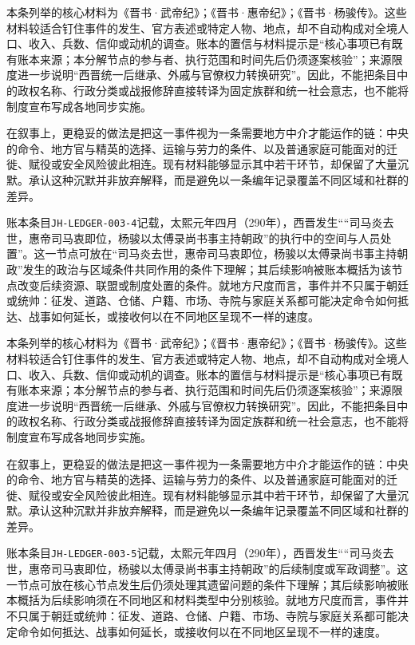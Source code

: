 本条列举的核心材料为《晋书·武帝纪》；《晋书·惠帝纪》；《晋书·杨骏传》。这些材料较适合钉住事件的发生、官方表述或特定人物、地点，却不自动构成对全境人口、收入、兵数、信仰或动机的调查。账本的置信与材料提示是“核心事项已有既有账本来源；本分解节点的参与者、执行范围和时间先后仍须逐案核验”；来源限度进一步说明“西晋统一后继承、外戚与官僚权力转换研究”。因此，不能把条目中的政权名称、行政分类或战报修辞直接转译为固定族群和统一社会意志，也不能将制度宣布写成各地同步实施。

在叙事上，更稳妥的做法是把这一事件视为一条需要地方中介才能运作的链：中央的命令、地方官与精英的选择、运输与劳力的条件、以及普通家庭可能面对的迁徙、赋役或安全风险彼此相连。现有材料能够显示其中若干环节，却保留了大量沉默。承认这种沉默并非放弃解释，而是避免以一条编年记录覆盖不同区域和社群的差异。

账本条目\texttt{JH-LEDGER-003-4}记载，太熙元年四月（290年），西晋发生““司马炎去世，惠帝司马衷即位，杨骏以太傅录尚书事主持朝政”的执行中的空间与人员处置”。这一节点可放在“司马炎去世，惠帝司马衷即位，杨骏以太傅录尚书事主持朝政”发生的政治与区域条件共同作用的条件下理解；其后续影响被账本概括为该节点改变后续资源、联盟或制度处置的条件。就地方尺度而言，事件并不只属于朝廷或统帅：征发、道路、仓储、户籍、市场、寺院与家庭关系都可能决定命令如何抵达、战事如何延长，或接收何以在不同地区呈现不一样的速度。

本条列举的核心材料为《晋书·武帝纪》；《晋书·惠帝纪》；《晋书·杨骏传》。这些材料较适合钉住事件的发生、官方表述或特定人物、地点，却不自动构成对全境人口、收入、兵数、信仰或动机的调查。账本的置信与材料提示是“核心事项已有既有账本来源；本分解节点的参与者、执行范围和时间先后仍须逐案核验”；来源限度进一步说明“西晋统一后继承、外戚与官僚权力转换研究”。因此，不能把条目中的政权名称、行政分类或战报修辞直接转译为固定族群和统一社会意志，也不能将制度宣布写成各地同步实施。

在叙事上，更稳妥的做法是把这一事件视为一条需要地方中介才能运作的链：中央的命令、地方官与精英的选择、运输与劳力的条件、以及普通家庭可能面对的迁徙、赋役或安全风险彼此相连。现有材料能够显示其中若干环节，却保留了大量沉默。承认这种沉默并非放弃解释，而是避免以一条编年记录覆盖不同区域和社群的差异。

账本条目\texttt{JH-LEDGER-003-5}记载，太熙元年四月（290年），西晋发生““司马炎去世，惠帝司马衷即位，杨骏以太傅录尚书事主持朝政”的后续制度或军政调整”。这一节点可放在核心节点发生后仍须处理其遗留问题的条件下理解；其后续影响被账本概括为后续影响须在不同地区和材料类型中分别核验。就地方尺度而言，事件并不只属于朝廷或统帅：征发、道路、仓储、户籍、市场、寺院与家庭关系都可能决定命令如何抵达、战事如何延长，或接收何以在不同地区呈现不一样的速度。

